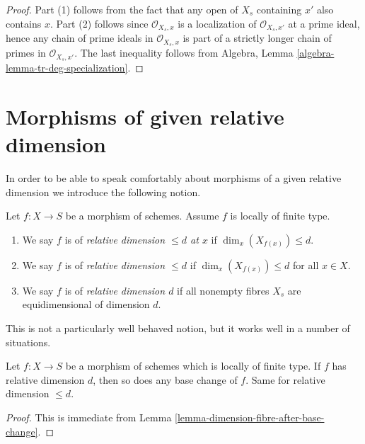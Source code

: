 \begin{proof}
Part (1) follows from the fact that any open of $X_s$ containing $x'$
also contains $x$. Part (2) follows since $\mathcal{O}_{X_s, x}$ is a
localization of $\mathcal{O}_{X_s, x'}$ at a prime ideal, hence any chain
of prime ideals in $\mathcal{O}_{X_s, x}$ is part of a strictly longer
chain of primes in $\mathcal{O}_{X_s, x'}$. The last inequality follows from
Algebra, Lemma \ref{algebra-lemma-tr-deg-specialization}.
\end{proof}






\section{Morphisms of given relative dimension}
\label{section-relative-dimension}

\noindent
In order to be able to speak comfortably about morphisms of a
given relative dimension we introduce the following notion.

\begin{definition}
\label{definition-relative-dimension-d}
Let $f : X \to S$ be a morphism of schemes.
Assume $f$ is locally of finite type.
\begin{enumerate}
\item We say $f$ is of {\it relative dimension $\leq d$ at $x$} if
$\dim_x(X_{f(x)}) \leq d$.
\item We say $f$ is of {\it relative dimension $\leq d$} if
$\dim_x(X_{f(x)}) \leq d$ for all $x \in X$.
\item We say $f$ is of {\it relative dimension $d$} if
all nonempty fibres $X_s$ are equidimensional of dimension $d$.
\end{enumerate}
\end{definition}

\noindent
This is not a particularly well behaved notion, but it works well
in a number of situations.

\begin{lemma}
\label{lemma-base-change-relative-dimension-d}
Let $f : X \to S$ be a morphism of schemes which is locally of finite type.
If $f$ has relative dimension $d$, then so does any base change of $f$.
Same for relative dimension $\leq d$.
\end{lemma}

\begin{proof}
This is immediate from
Lemma \ref{lemma-dimension-fibre-after-base-change}.
\end{proof}

